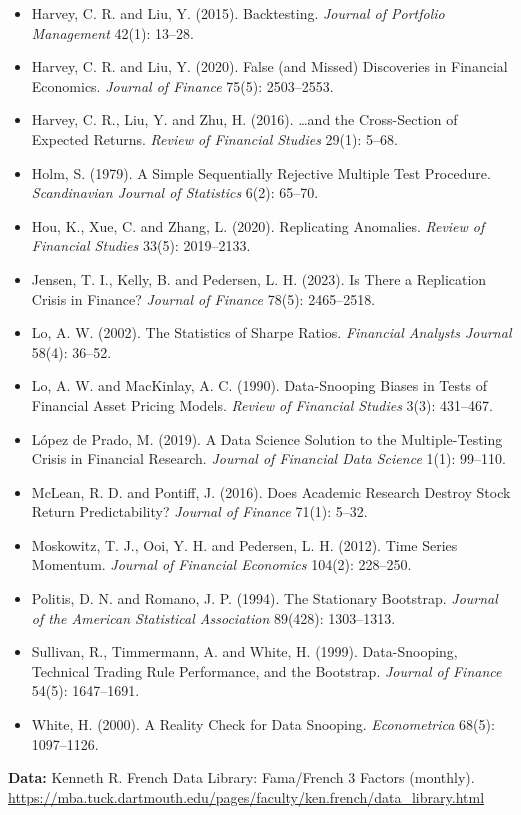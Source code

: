 \begin{itemize}
  \item Harvey, C. R. and Liu, Y. (2015). Backtesting. \emph{Journal of Portfolio Management} 42(1): 13--28.
  \item Harvey, C. R. and Liu, Y. (2020). False (and Missed) Discoveries in Financial Economics. \emph{Journal of Finance} 75(5): 2503--2553.
  \item Harvey, C. R., Liu, Y. and Zhu, H. (2016). \ldots and the Cross-Section of Expected Returns. \emph{Review of Financial Studies} 29(1): 5--68.
  \item Holm, S. (1979). A Simple Sequentially Rejective Multiple Test Procedure. \emph{Scandinavian Journal of Statistics} 6(2): 65--70.
  \item Hou, K., Xue, C. and Zhang, L. (2020). Replicating Anomalies. \emph{Review of Financial Studies} 33(5): 2019--2133.
  \item Jensen, T. I., Kelly, B. and Pedersen, L. H. (2023). Is There a Replication Crisis in Finance? \emph{Journal of Finance} 78(5): 2465--2518.
  \item Lo, A. W. (2002). The Statistics of Sharpe Ratios. \emph{Financial Analysts Journal} 58(4): 36--52.
  \item Lo, A. W. and MacKinlay, A. C. (1990). Data-Snooping Biases in Tests of Financial Asset Pricing Models. \emph{Review of Financial Studies} 3(3): 431--467.
  \item L\'opez de Prado, M. (2019). A Data Science Solution to the Multiple-Testing Crisis in Financial Research. \emph{Journal of Financial Data Science} 1(1): 99--110.
  \item McLean, R. D. and Pontiff, J. (2016). Does Academic Research Destroy Stock Return Predictability? \emph{Journal of Finance} 71(1): 5--32.
  \item Moskowitz, T. J., Ooi, Y. H. and Pedersen, L. H. (2012). Time Series Momentum. \emph{Journal of Financial Economics} 104(2): 228--250.
  \item Politis, D. N. and Romano, J. P. (1994). The Stationary Bootstrap. \emph{Journal of the American Statistical Association} 89(428): 1303--1313.
  \item Sullivan, R., Timmermann, A. and White, H. (1999). Data-Snooping, Technical Trading Rule Performance, and the Bootstrap. \emph{Journal of Finance} 54(5): 1647--1691.
  \item White, H. (2000). A Reality Check for Data Snooping. \emph{Econometrica} 68(5): 1097--1126.
\end{itemize}

\textbf{Data:} Kenneth R. French Data Library: Fama/French 3 Factors (monthly). \url{https://mba.tuck.dartmouth.edu/pages/faculty/ken.french/data_library.html}
